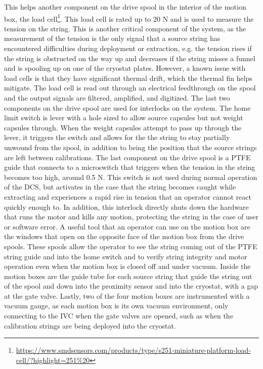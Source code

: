 This helps another component on the drive spool in the interior of the motion box, the load cell\footnote{\url{https://www.smdsensors.com/products/type/s251-miniature-platform-load-cell/?highlight=251\%20}}.
This load cell is rated up to 20 N and is used to measure the tension on the string.
This is another critical component of the system, as the measurement of the tension is the only signal that a source string has encountered difficulties during deployment or extraction, e.g. the tension rises if the string is obstructed on the way up and decreases if the string misses a funnel and is spooling up on one of the cryostat plates.
However, a known issue with load cells is that they have significant thermal drift, which the thermal fin helps mitigate.
The load cell is read out through an electrical feedthrough on the spool and the output signals are filtered, amplified, and digitized.
The last two components on the drive spool are used for interlocks on the system.
The home limit switch is lever with a hole sized to allow source capsules but not weight capsules through.
When the weight capsules attempt to pass up through the lever, it triggers the switch and allows for the the string to stay partially unwound from the spool, in addition to being the position that the source strings are left between calibrations.
The last component on the drive spool is a PTFE guide that connects to a microswitch that triggers when the tension in the string becomes too high, around 0.5 N.
This switch is not used during normal operation of the DCS, but activates in the case that the string becomes caught while extracting and experiences a rapid rise in tension that an operator cannot react quickly enough to.
In addition, this interlock directly shuts down the hardware that runs the motor and kills any motion, protecting the string in the case of user or software error.
A useful tool that an operator can use on the motion box are the windows that open on the opposite face of the motion box from the drive spools. These spools allow the operator to see the string coming out of the PTFE string guide and into the home switch and to verify string integrity and motor operation even when the motion box is closed off and under vacuum.
Inside the motion boxes are the guide tube for each source string that guide the string out of the spool and down into the proximity sensor and into the cryostat, with a gap at the gate valve.
Lastly, two of the four motion boxes are instrumented with a vacuum gauge, as each motion box is its own vacuum environment, only connecting to the IVC when the gate valves are opened, such as when the calibration strings are being deployed into the cryostat.
